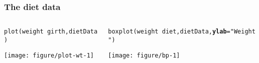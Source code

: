 \documentclass[color=usenames,dvipsnames]{beamer}\usepackage[]{graphicx}\usepackage[]{color}
\makeatletter
\newcommand{\hlstr}[1]{\textcolor[rgb]{0.749,0.012,0.012}{#1}}%
\newcommand{\hlopt}[1]{\textcolor[rgb]{0,0,0}{#1}}%
\newcommand{\hlstd}[1]{\textcolor[rgb]{0,0,0}{#1}}%
\newcommand{\hlkwc}[1]{\textcolor[rgb]{0,0,0}{\textbf{#1}}}%
\newcommand{\hlkwd}[1]{\textcolor[rgb]{0.004,0.004,0.506}{#1}}%
\newenvironment{kframe}{%
 \def\at@end@of@kframe{}%
 \ifinner\ifhmode%
  \def\at@end@of@kframe{\end{minipage}}%
  \begin{minipage}{\columnwidth}%
 \fi\fi%
 \def\FrameCommand##1{\hskip\@totalleftmargin \hskip-\fboxsep
 \colorbox{shadecolor}{##1}\hskip-\fboxsep
     \hskip-\linewidth \hskip-\@totalleftmargin \hskip\columnwidth}%
 \MakeFramed {\advance\hsize-\width
   \@totalleftmargin\z@ \linewidth\hsize
   \@setminipage}}%
 {\par\unskip\endMakeFramed%
 \at@end@of@kframe}
\newenvironment{knitrout}{}{} %
\makeatother
\begin{document}
\begin{frame}[fragile]
  \frametitle{The diet data}
  \begin{columns}
    \begin{column}{0.5\textwidth}
      \tiny %
\begin{knitrout}
\color{fgcolor}\begin{kframe}
\begin{alltt}
\hlkwd{plot}\hlstd{(weight} \hlopt{~} \hlstd{girth, dietData)}
\end{alltt}
\end{kframe}
\end{knitrout}
    \texttt{[image: figure/plot-wt-1]}
    \end{column}
    \begin{column}{0.5\textwidth}
      \tiny %
\begin{knitrout}
\color{fgcolor}\begin{kframe}
\begin{alltt}
\hlkwd{boxplot}\hlstd{(weight} \hlopt{~} \hlstd{diet, dietData,} \hlkwc{ylab}\hlstd{=}\hlstr{"Weight"}\hlstd{)}
\end{alltt}
\end{kframe}
\end{knitrout}
    \texttt{[image: figure/bp-1]}
    \end{column}
  \end{columns}
\end{frame}
\end{document}
